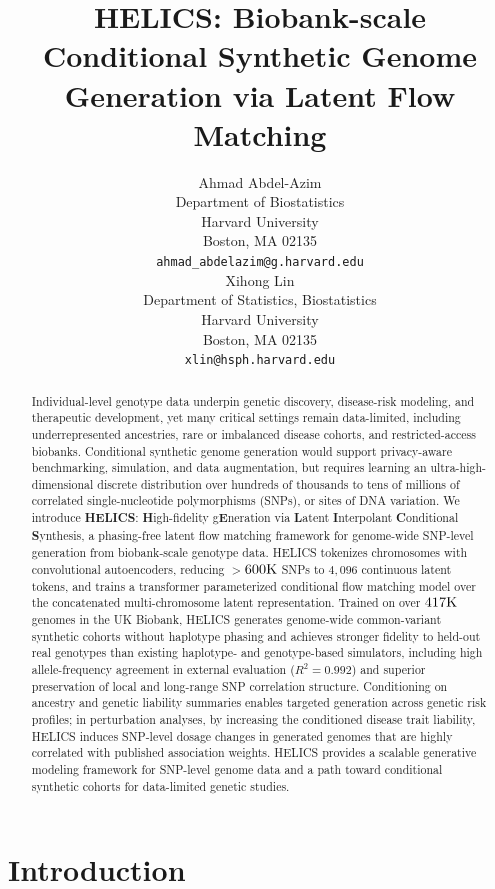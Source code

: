\documentclass{article}
\title{HELICS: Biobank-scale Conditional Synthetic Genome Generation via Latent Flow Matching}
\author{
  Ahmad Abdel-Azim \\
  Department of Biostatistics\\
  Harvard University\\
  Boston, MA 02135 \\
  \texttt{ahmad\_abdelazim@g.harvard.edu} \\
  \And
  Xihong Lin \\
  Department of Statistics, Biostatistics\\
  Harvard University\\
  Boston, MA 02135 \\
  \texttt{xlin@hsph.harvard.edu}
}
\begin{document}
\maketitle


\begin{abstract}
    Individual-level genotype data underpin genetic discovery, disease-risk modeling, and therapeutic development, yet many critical settings remain data-limited, including underrepresented ancestries, rare or imbalanced disease cohorts, and restricted-access biobanks. Conditional synthetic genome generation would support privacy-aware benchmarking, simulation, and data augmentation, but requires learning an ultra-high-dimensional discrete distribution over hundreds of thousands to tens of millions of correlated single-nucleotide polymorphisms (SNPs), or sites of DNA variation. We introduce \textbf{HELICS}: \textbf{H}igh-fidelity g\textbf{E}neration via \textbf{L}atent \textbf{I}nterpolant \textbf{C}onditional \textbf{S}ynthesis, a phasing-free latent flow matching framework for genome-wide SNP-level generation from biobank-scale genotype data. HELICS tokenizes chromosomes with convolutional autoencoders, reducing \(>\)\(600{\rm K}\) SNPs to \(4{,}096\) continuous latent tokens, and trains a transformer parameterized conditional flow matching model over the concatenated multi-chromosome latent representation. Trained on over \(417\rm K\) genomes in the UK Biobank, HELICS generates genome-wide common-variant synthetic cohorts without haplotype phasing and achieves stronger fidelity to held-out real genotypes than existing haplotype- and genotype-based simulators, including high allele-frequency agreement in external evaluation (\(R^2=0.992\)) and superior preservation of local and long-range SNP correlation structure. Conditioning on ancestry and genetic liability summaries enables targeted generation across genetic risk profiles; in perturbation analyses, by increasing the conditioned disease trait liability, HELICS induces SNP-level dosage changes in generated genomes that are highly correlated with published association weights. HELICS provides a scalable generative modeling framework for SNP-level genome data and a path toward conditional synthetic cohorts for data-limited genetic studies.
\end{abstract}


\section{Introduction}
\end{document}
